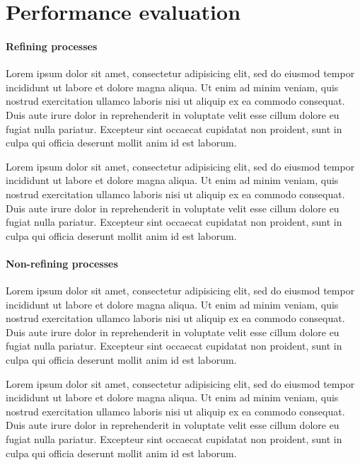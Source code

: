 \section{Performance evaluation}

\paragraph{Refining processes}

Lorem ipsum dolor sit amet, consectetur adipisicing elit, sed do eiusmod tempor incididunt ut labore et dolore magna aliqua. Ut enim ad minim veniam, quis nostrud exercitation ullamco laboris nisi ut aliquip ex ea commodo consequat. Duis aute irure dolor in reprehenderit in voluptate velit esse cillum dolore eu fugiat nulla pariatur. Excepteur sint occaecat cupidatat non proident, sunt in culpa qui officia deserunt mollit anim id est laborum.

Lorem ipsum dolor sit amet, consectetur adipisicing elit, sed do eiusmod tempor incididunt ut labore et dolore magna aliqua. Ut enim ad minim veniam, quis nostrud exercitation ullamco laboris nisi ut aliquip ex ea commodo consequat. Duis aute irure dolor in reprehenderit in voluptate velit esse cillum dolore eu fugiat nulla pariatur. Excepteur sint occaecat cupidatat non proident, sunt in culpa qui officia deserunt mollit anim id est laborum.

\paragraph{Non-refining processes}

Lorem ipsum dolor sit amet, consectetur adipisicing elit, sed do eiusmod tempor incididunt ut labore et dolore magna aliqua. Ut enim ad minim veniam, quis nostrud exercitation ullamco laboris nisi ut aliquip ex ea commodo consequat. Duis aute irure dolor in reprehenderit in voluptate velit esse cillum dolore eu fugiat nulla pariatur. Excepteur sint occaecat cupidatat non proident, sunt in culpa qui officia deserunt mollit anim id est laborum.

Lorem ipsum dolor sit amet, consectetur adipisicing elit, sed do eiusmod tempor incididunt ut labore et dolore magna aliqua. Ut enim ad minim veniam, quis nostrud exercitation ullamco laboris nisi ut aliquip ex ea commodo consequat. Duis aute irure dolor in reprehenderit in voluptate velit esse cillum dolore eu fugiat nulla pariatur. Excepteur sint occaecat cupidatat non proident, sunt in culpa qui officia deserunt mollit anim id est laborum.

